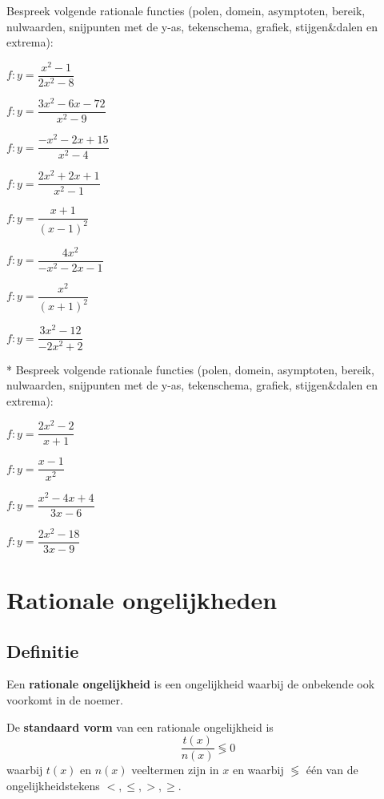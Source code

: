 \documentclass[12pt,twoside,a4paper]{article}
\begin{document}
\begin{oefening}
Bespreek volgende rationale functies (polen, domein, asymptoten, bereik, nulwaarden, snijpunten met de y-as, tekenschema, grafiek, stijgen\&dalen en extrema):
\begin{exlist}{2}
  \item $f:y=\dfrac{x^2-1}{2x^2-8}$
  \item $f:y=\dfrac{3x^2-6x-72}{x^2-9}$
  \item $f:y=\dfrac{-x^2-2x+15}{x^2-4}$
  \item $f:y=\dfrac{2x^2+2x+1}{x^2-1}$
  \item $f:y=\dfrac{x+1}{(x-1)^2}$
  \item $f:y=\dfrac{4x^2}{-x^2-2x-1}$
  \item $f:y=\dfrac{x^2}{(x+1)^2}$
  \item $f:y=\dfrac{3x^2-12}{-2x^2+2}$
\end{exlist}
\end{oefening}

\begin{oefening}*
Bespreek volgende rationale functies (polen, domein, asymptoten, bereik, nulwaarden, snijpunten met de y-as, tekenschema, grafiek, stijgen\&dalen en extrema):
\begin{exlist}{2}
\item $f:y=\dfrac{2x^2-2}{x+1}$
\item $f:y=\dfrac{x-1}{x^2}$
\item $f:y=\dfrac{x^2-4x+4}{3x-6}$
\item $f:y=\dfrac{2x^2-18}{3x-9}$
\end{exlist}
\end{oefening}

\cleardoublepage
\section{Rationale ongelijkheden}

\subsection{Definitie}

Een {\bf rationale ongelijkheid} is een ongelijkheid waarbij de onbekende ook voorkomt in de noemer.

De {\bf standaard vorm} van een rationale ongelijkheid is
$$\dfrac{t(x)}{n(x)} \lessgtr 0$$
waarbij $t(x)$ en $n(x)$ veeltermen zijn in $x$ en waarbij $\lessgtr$ één van de ongelijkheidstekens $<, \leq, >, \geq$.
\end{document}
